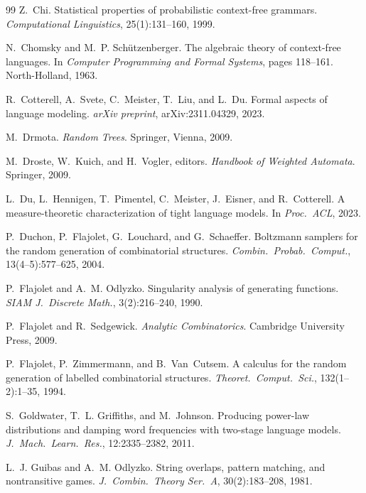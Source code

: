 \begin{thebibliography}{99}
Z.~Chi.
\newblock Statistical properties of probabilistic context-free grammars.
\newblock \emph{Computational Linguistics}, 25(1):131--160, 1999.

N.~Chomsky and M.~P. Sch\"utzenberger.
\newblock The algebraic theory of context-free languages.
\newblock In \emph{Computer Programming and Formal Systems}, pages 118--161. North-Holland, 1963.

R.~Cotterell, A.~Svete, C.~Meister, T.~Liu, and L.~Du.
\newblock Formal aspects of language modeling.
\newblock \emph{arXiv preprint}, arXiv:2311.04329, 2023.

M.~Drmota.
\newblock \emph{Random Trees}.
\newblock Springer, Vienna, 2009.

M.~Droste, W.~Kuich, and H.~Vogler, editors.
\newblock \emph{Handbook of Weighted Automata}.
\newblock Springer, 2009.

L.~Du, L.~Hennigen, T.~Pimentel, C.~Meister, J.~Eisner, and R.~Cotterell.
\newblock A measure-theoretic characterization of tight language models.
\newblock In \emph{Proc.\ ACL}, 2023.

P.~Duchon, P.~Flajolet, G.~Louchard, and G.~Schaeffer.
\newblock Boltzmann samplers for the random generation of combinatorial structures.
\newblock \emph{Combin.\ Probab.\ Comput.}, 13(4--5):577--625, 2004.

P.~Flajolet and A.~M. Odlyzko.
\newblock Singularity analysis of generating functions.
\newblock \emph{SIAM J.\ Discrete Math.}, 3(2):216--240, 1990.

P.~Flajolet and R.~Sedgewick.
\newblock \emph{Analytic Combinatorics}.
\newblock Cambridge University Press, 2009.

P.~Flajolet, P.~Zimmermann, and B.~Van~Cutsem.
\newblock A calculus for the random generation of labelled combinatorial structures.
\newblock \emph{Theoret.\ Comput.\ Sci.}, 132(1--2):1--35, 1994.

S.~Goldwater, T.~L. Griffiths, and M.~Johnson.
\newblock Producing power-law distributions and damping word frequencies with two-stage language models.
\newblock \emph{J.\ Mach.\ Learn.\ Res.}, 12:2335--2382, 2011.

L.~J. Guibas and A.~M. Odlyzko.
\newblock String overlaps, pattern matching, and nontransitive games.
\newblock \emph{J.\ Combin.\ Theory Ser.~A}, 30(2):183--208, 1981.


\end{thebibliography}
